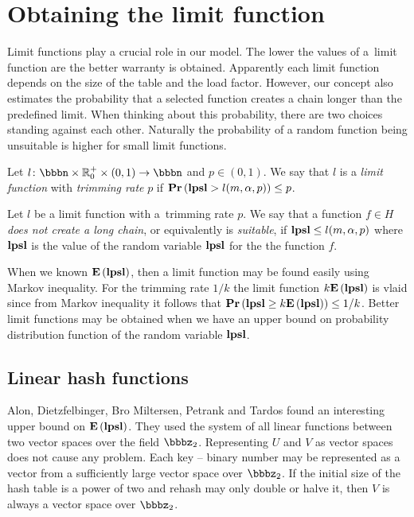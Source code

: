 \section{Obtaining the limit function}
\label{section-limit}
Limit functions play a crucial role in our model. The lower the values of a~limit function are the better warranty is obtained. Apparently each limit function depends on the size of the table and the load factor. However, our concept also estimates the probability that a selected function creates a chain longer than the predefined limit. When thinking about this probability, there are two choices standing against each other. Naturally the probability of a random function being unsuitable is higher for small limit functions.

\begin{definition}
\label{definition-limit-function}
Let $l\colon \bbbn \times \mathbb{R}_0^+ \times (0, 1) \rightarrow \bbbn$ and $p \in (0, 1)$.  We say that $l$ is a \emph{limit function} with \emph{trimming rate} $p$ if $\mathbf{Pr}\left(\mathbf{lpsl} > l(m, \alpha, p)\right) \leq p$.

Let $l$ be a limit function with a~trimming rate $p$. We say that a function $f \in H$ \emph{does not create a long chain}, or equivalently is \emph{suitable}, if $\mathbf{lpsl} \le l(m, \alpha, p)$ where $\mathbf{lpsl}$ is the value of the random variable $\mathbf{lpsl}$ for the the function $f$.
\end{definition}

When we known $\mathbf{E}\left(\mathbf{lpsl}\right)$, then a limit function may be found easily using Markov inequality. For the trimming rate $1/k$ the limit function $k \mathbf{E}\left(\mathbf{lpsl}\right)$ is vlaid since from Markov inequality it follows that $\mathbf{Pr}\left(\mathbf{lpsl} \geq k \mathbf{E}\left(\mathbf{lpsl}\right)\right) \leq {1}/{k}$. Better limit functions may be obtained when we have an upper bound on probability distribution function of the random variable $\mathbf{lpsl}$.

\subsection{Linear hash functions}
Alon, Dietzfelbinger, Bro Miltersen, Petrank and Tardos \cite{DBLP:journals/jacm/AlonDMPT99} found an interesting upper bound on $\mathbf{E}\left(\mathbf{lpsl}\right)$. They used the system of all linear functions between two vector spaces over the field $\bbbz_2$. Representing $U$ and $V$ as vector spaces does not cause any problem. Each key -- binary number may be represented as a vector from a sufficiently large vector space over $\bbbz_2$. If the initial size of the hash table is a power of two and rehash may only double or halve it, then $V$ is always a vector space over $\bbbz_2$.

